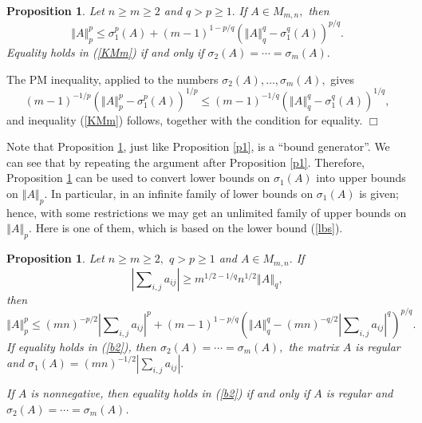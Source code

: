 \documentclass[12pt]{article}%
\newtheorem{proposition}[theorem]{Proposition}
\newenvironment{proof}[1][Proof]{\noindent{\textbf {#1}  }}  {\hfill$\Box$\bigskip}
\begin{document}
\begin{proposition}
\label{p2}Let $n\geq m\geq2$ and $q>p\geq1.$ If $A\in M_{m,n},$ then
\begin{equation}
\left\Vert A\right\Vert _{p}^{p}\leq\sigma_{1}^{p}\left(  A\right)  +\left(
m-1\right)  ^{1-p/q}\left(  \left\Vert A\right\Vert _{q}^{q}-\sigma_{1}%
^{q}\left(  A\right)  \right)  ^{p/q}. \label{KMm}%
\end{equation}
Equality holds in (\ref{KMm}) if and only if $\sigma_{2}\left(  A\right)
=\cdots=\sigma_{m}\left(  A\right)  .$
\end{proposition}

\begin{proof}
The PM inequality, applied to the numbers $\sigma_{2}\left(  A\right)
,\ldots,\sigma_{m}\left(  A\right)  ,$ gives
\[
\left(  m-1\right)  ^{-1/p}\left(  \left\Vert A\right\Vert _{p}^{p}-\sigma
_{1}^{p}\left(  A\right)  \right)  ^{1/p}\leq\left(  m-1\right)
^{-1/q}\left(  \left\Vert A\right\Vert _{q}^{q}-\sigma_{1}^{q}\left(
A\right)  \right)  ^{1/q},
\]
and inequality (\ref{KMm}) follows, together with the condition for equality.
\end{proof}

Note that Proposition \ref{p2}, just like Proposition \ref{p1}, is a
\textquotedblleft bound generator\textquotedblright. We can see that by
repeating the argument after Proposition \ref{p1}. Therefore, Proposition
\ref{p2} can be used to convert lower bounds on $\sigma_{1}\left(  A\right)  $
into upper bounds on $\left\Vert A\right\Vert _{p}.$ In particular, in
\cite{Nik07a} an infinite family of lower bounds on $\sigma_{1}\left(
A\right)  $ is given; hence, with some restrictions we may get an unlimited
family of upper bounds on $\left\Vert A\right\Vert _{p}.$ Here is one of them,
which is based on the lower bound (\ref{lbs}).

\begin{proposition}
\label{p2s}Let $n\geq m\geq2,$ $q>p\geq1$ and $A\in M_{m,n}.$ If
\[
\left\vert \sum\nolimits_{i,j}a_{ij}\right\vert \geq m^{1/2-1/q}%
n^{1/2}\left\Vert A\right\Vert _{q},
\]
then
\[
\left\Vert A\right\Vert _{p}^{p}\leq\left(  mn\right)  ^{-p/2}\left\vert
\sum\nolimits_{i,j}a_{ij}\right\vert ^{p}+\left(  m-1\right)  ^{1-p/q}\left(
\left\Vert A\right\Vert _{q}^{q}-\left(  mn\right)  ^{-q/2}\left\vert
\sum\nolimits_{i,j}a_{ij}\right\vert ^{q}\right)  ^{p/q}.
\]
If equality holds in (\ref{b2}), then $\sigma_{2}\left(  A\right)
=\cdots=\sigma_{m}\left(  A\right)  ,$ the matrix $A$ is regular and
$\sigma_{1}\left(  A\right)  =\left(  mn\right)  ^{-1/2}\left\vert
\sum\nolimits_{i,j}a_{ij}\right\vert .$

If $A$ is nonnegative, then equality holds in (\ref{b2}) if and only if $A$ is
regular and $\sigma_{2}\left(  A\right)  =\cdots=\sigma_{m}\left(  A\right)  $.
\end{proposition}
\end{document}
